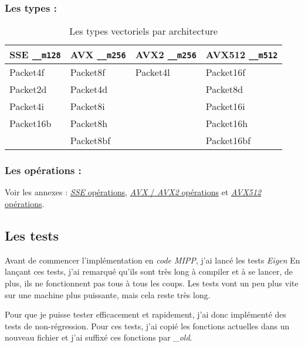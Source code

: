 \subsubsection{Les types :}

\begin{table}[H]
  \label{eigenTypesTable}
  \centering
  \begin{tabular}[H]{|l|l|l|l|}
    \hline
    \textbf{SSE} \verb|__m128| & \textbf{AVX} \verb|__m256| & \textbf{AVX2} \verb|__m256| & \textbf{AVX512} \verb|__m512|\\
    \hline
    Packet4f     & Packet8f     & Packet4l      & Packet16f       \\
    \hline
    Packet2d     & Packet4d     &               & Packet8d        \\
    \hline
    Packet4i     & Packet8i     &               & Packet16i       \\
    \hline
    Packet16b    & Packet8h     &               & Packet16h       \\
    \hline
                 & Packet8bf    &               & Packet16bf      \\
    \hline
  \end{tabular}
  \caption{Les types vectoriels \Eigen par architecture}
\end{table}

\subsubsection{Les opérations :}

Voir les annexes : \hyperref[tbl:sseOperations]{\emph{SSE} opérations},
\hyperref[tbl:avxOperations]{\emph{AVX} / \emph{AVX2} opérations} et
\hyperref[tbl:avx512Operations]{\emph{AVX512} opérations}.

\subsection{Les tests}

Avant de commencer l'implémentation en \emph{code MIPP}, j'ai lancé les tests \emph{Eigen}
En lançant ces tests, j'ai remarqué qu'ils sont très long à compiler et à se lancer, de
plus, ils ne fonctionnent pas tous à tous les coups. Les tests vont un peu plus vite sur
une machine plus puissante, mais cela reste très long.

Pour que je puisse tester efficacement et rapidement, j'ai donc implémenté des tests de non-régression.
Pour ces tests, j'ai copié les fonctions actuelles dans un nouveau fichier et
j'ai suffixé ces fonctions par \emph{_old}.

